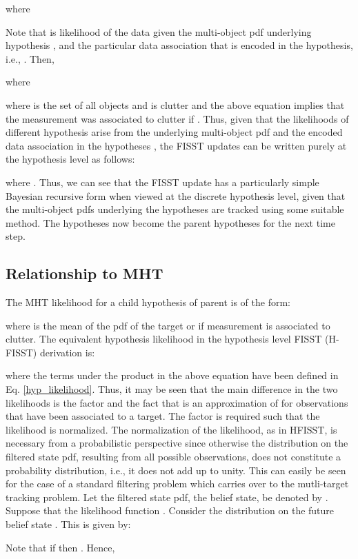 \documentclass[10pt, conference]{IEEEtran}
\begin{document}
where

Note that  is likelihood of the data  given the multi-object pdf underlying hypothesis , and the particular data association that is encoded in the hypothesis, i.e., . Then,

where

where  is the set of all objects and  is clutter and the above equation implies that the measurement  was associated to clutter if .
Thus, given that the likelihoods of different hypothesis  arise from the underlying multi-object pdf and the encoded data association in the hypotheses , the FISST updates can be written purely at the hypothesis level as follows:

where . Thus, we can see that the FISST update has a particularly simple Bayesian recursive form when viewed at the discrete hypothesis level, given that the multi-object pdfs underlying the hypotheses  are tracked using some suitable method. 
The hypotheses  now become the parent hypotheses for the next time step.


\subsection{Relationship to MHT} 
 The MHT likelihood for a child hypothesis  of parent  is of the form:

where  is the mean of the pdf of the target  or  if measurement   is associated to clutter. The equivalent hypothesis likelihood in the hypothesis level FISST (H-FISST) derivation is:

where the terms under the product in the above equation have been defined in Eq. \ref{hyp_likelihood}. Thus, it may be seen that the main difference in the two likelihoods is the factor  and the fact that  is an approximation of  for observations that have been associated to a target. The factor is required such that the likelihood is normalized. The normalization of the likelihood, as in HFISST, is necessary from a probabilistic perspective since otherwise the distribution on the filtered state pdf, resulting from all possible observations, does not constitute a probability distribution, i.e., it does not add up to unity. This can easily be seen for the case of a standard filtering problem which carries over to the mutli-target tracking problem. Let the filtered state pdf, the belief state, be denoted by . Suppose that the likelihood function . Consider the distribution on the future belief state . This is given by:

Note that if  then . Hence,
\end{document}

